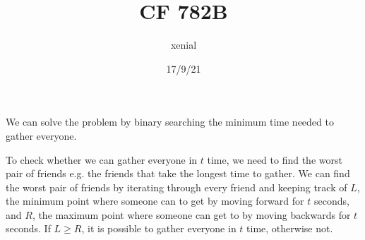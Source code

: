 \documentclass{article}
\title{CF 782B}
\author{xenial}
\date{17/9/21}
\begin{document}
    \maketitle
    We can solve the problem by binary searching the minimum time needed to gather everyone.
    
    To check whether we can gather everyone in $t$ time, we need to find the worst pair of friends e.g. the friends that take the longest time to gather. We can find the worst pair of friends by iterating through every friend and keeping track of $L$, the minimum point where someone can to get by moving forward for $t$ seconds, and $R$, the maximum point where someone can get to by moving backwards  for $t$ seconds.
    If $L \geq R$, it is possible to gather everyone in $t$ time, otherwise not.
\end{document}
